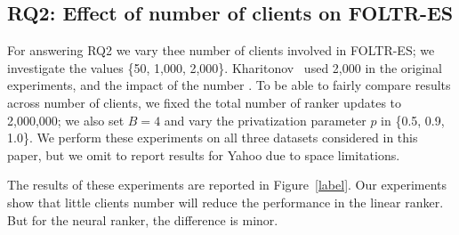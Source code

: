 %

\subsection{RQ2: Effect of number of clients on FOLTR-ES}

For answering RQ2 we vary thee number of clients involved in FOLTR-ES; we investigate the values \{50, 1,000, 2,000\}. Kharitonov~\cite{kharitonov2019federated} used 2,000 in the original experiments, and the impact of the number . To be able to fairly compare results across number of clients, we fixed the total number of ranker updates to 2,000,000; we also set $B = 4$ and vary the privatization parameter $p$ in \{0.5, 0.9, 1.0\}. We perform these experiments on all three datasets considered in this paper, but we omit to report results for Yahoo due to space limitations. 

The results of these experiments are reported in Figure~\ref{label}. Our experiments show that little clients number will reduce the performance in the linear ranker. But for the neural ranker, the difference is minor.



